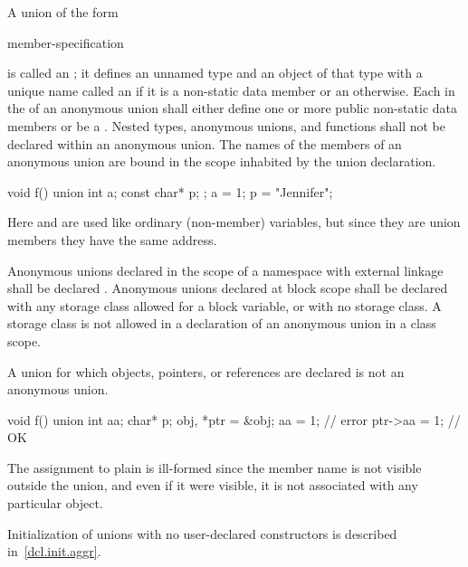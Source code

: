 \pnum
{}%
%
A union of the form
\begin{ncsimplebnf}
 \terminal{\{} member-specification \terminal{\}} \terminal{;}
\end{ncsimplebnf}
is called an ; it defines an unnamed type and
an object of that type with a unique name called
an 
if it is a non-static data member or
an  otherwise.
%
%
Each  in the 
of an anonymous union shall either define one or more public non-static data members or
be a .
Nested types, anonymous unions, and functions
shall not be declared within an anonymous union.
The names of the members of an anonymous union
are bound in the scope inhabited by the union declaration.
\begin{example}
\begin{codeblock}
void f() {
  union { int a; const char* p; };
  a = 1;
  p = "Jennifer";
}
\end{codeblock}

Here  and  are used like ordinary (non-member)
variables, but since they are union members they have the same address.
\end{example}

\pnum
{}%
%
Anonymous unions declared in the scope of a namespace with external linkage
shall be declared . Anonymous unions declared at
block scope shall be declared with any storage class allowed for a
block variable, or with no storage class. A storage class is not
allowed in a declaration of an anonymous union in a class scope.

\pnum
\begin{note}
A union for which objects, pointers, or references are declared is not an anonymous union.
\begin{example}
\begin{codeblock}
void f() {
  union { int aa; char* p; } obj, *ptr = &obj;
  aa = 1;           // error
  ptr->aa = 1;      // OK
}
\end{codeblock}

The assignment to plain  is ill-formed since the member name
is not visible outside the union, and even if it were visible, it is not
associated with any particular object.
\end{example}
\end{note}
\begin{note}
Initialization of unions with no user-declared constructors is described
in~\ref{dcl.init.aggr}.
\end{note}

